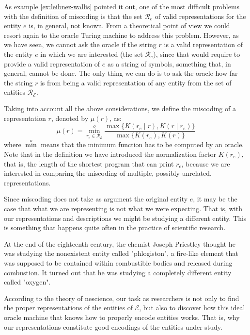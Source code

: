 As example \ref{ex:leibnez-wallis} pointed it out, one of the most difficult problems with the definition of miscoding is that the set $\mathcal{R}_e$ of valid representations for the entity $e$ is, in general, not known. From a theoretical point of view we could resort again to the oracle Turing machine to address this problem. However, as we have seen, we cannot ask the oracle if the string $r$ is a valid representation of the entity $e$ in which we are interested (the set $\mathcal{R}_e$), since that would require to provide a valid representation of $e$ as a string of symbols, something that, in general, cannot be done. The only thing we can do is to ask the oracle how far the string $r$ is from being a valid representation of any entity from the set of entities $\mathcal{R}_\mathcal{E}$.

Taking into account all the above considerations, we define the miscoding of a representation $r$, denoted by $\mu(r)$, as:
\[
\mu(r) = \overset{o}{ \underset{r_e \in \mathcal{R}_\mathcal{E}} \min} \frac{ \max\{ K(r_e \mid r), K(r \mid r_e) \} } { \max\{ K(r_e), K(r) \} }
\]
where $\overset{o} \min$ means that the minimum function has to be computed by an oracle. Note that in the definition we have introduced the normalization factor $K(r_e)$, that is, the length of the shortest program that can print $r_e$, because we are interested in comparing the miscoding of multiple, possibly unrelated, representations.

Since miscoding does not take as argument the original entity $e$, it may be the case that what we are representing is not what we were expecting. That is, with our representations and descriptions we might be studying a different entity. This is something that happens quite often in the practice of scientific research. 

\begin{example}
At the end of the eighteenth century, the chemist Joseph Priestley thought he was studying the nonexistent entity called "phlogiston", a fire-like element that was supposed to be contained within combustible bodies and released during combustion. It turned out that he was studying a completely different entity called "oxygen".
\end{example}

According to the theory of nescience, our task as researchers is not only to find the proper representations of the entities of $\mathcal{E}$, but also to discover how this ideal oracle machine that knows how to properly encode entities works. That is, why our representations constitute good encodings of the entities under study.

